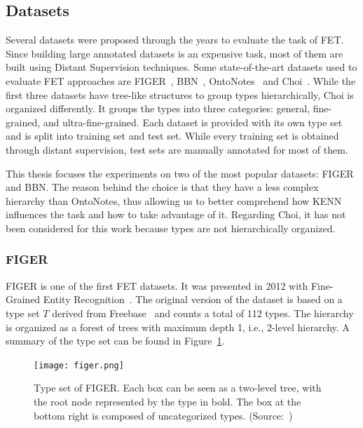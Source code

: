 \subsection{Datasets}
Several datasets were proposed through the years to evaluate the task of FET. Since building large annotated datasets is an expensive task, most of them are built using Distant Supervision techniques. Some state-of-the-art datasets used to evaluate FET approaches are FIGER~\cite{Ling2012FineGrainedER}, BBN~\cite{ren-etal-2016-afet}, OntoNotes~\cite{ontonotes} and Choi~\cite{choi}. While the first three datasets have tree-like structures to group types hierarchically, Choi is organized differently. It groups the types into three categories: general, fine-grained, and ultra-fine-grained. Each dataset is provided with its own type set and is split into training set and test set. While every training set is obtained through distant supervision, test sets are manually annotated for most of them.

This thesis focuses the experiments on two of the most popular datasets: FIGER and BBN. The reason behind the choice is that they have a less complex hierarchy than OntoNotes, thus allowing us to better comprehend how KENN influences the task and how to take advantage of it. Regarding Choi, it has not been considered for this work because types are not hierarchically organized.

\subsubsection{FIGER}
FIGER is one of the first FET datasets. It was presented in 2012 with Fine-Grained Entity Recognition~\cite{Ling2012FineGrainedER}. The original version of the dataset is based on a type set $T$ derived from Freebase~\cite{bollacker2008freebase} and counts a total of 112 types. The hierarchy is organized as a forest of trees with maximum depth 1, i.e., 2-level hierarchy. A summary of the type set can be found in Figure~\ref{fig:figer}.

\begin{figure}
    \centering
    \texttt{[image: figer.png]}
    \caption{Type set of FIGER. Each box can be seen as a two-level tree, with the root node represented by the type in bold. The box at the bottom right is composed of uncategorized types. (Source:~\cite{Ling2012FineGrainedER})}
    \label{fig:figer}
\end{figure}

